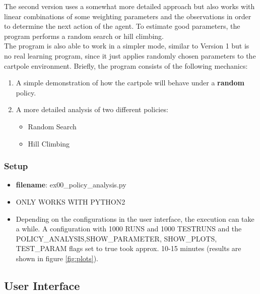 \documentclass[a4paper, 11pt]{article}
\begin{document}
The second version uses a somewhat more detailed approach but also works with linear combinations of some weighting parameters and the observations in order to determine the next action of the agent. To estimate good parameters, the program performs a random search or hill climbing.\\
The program is also able to work in a simpler mode, similar to Version 1 but is no real learning program, since it just applies randomly chosen parameters to the cartpole environment. Briefly, the program consists of the following mechanics:
\begin{enumerate}
	\item A simple demonstration of how the cartpole will behave under a \textbf{random} policy.
	\item A more detailed analysis of two different policies:
	\begin{itemize}
		\item Random Search
		\item Hill Climbing
	\end{itemize}
\end{enumerate}


\subsubsection{Setup}

\begin{itemize}
	\item \textbf{filename}: ex00\_policy\_analysis.py
	\item ONLY WORKS WITH PYTHON2
	\item Depending on the configurations in the user interface, the execution can take a while. A configuration with 1000 RUNS and 1000 TESTRUNS and the POLICY\_ANALYSIS,SHOW\_PARAMETER, SHOW\_PLOTS, TEST\_PARAM flags set to true took approx. 10-15 minutes (results are shown in figure \ref{fig:plots}).
\end{itemize}

\subsection{User Interface}
\end{document}
